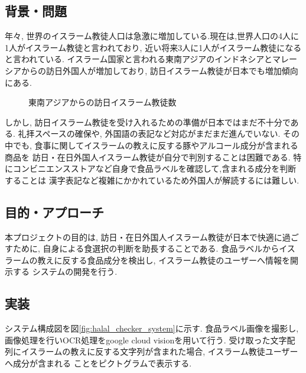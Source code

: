 \subsection{背景・問題}
年々, 世界のイスラーム教徒人口は急激に増加している.現在は,世界人口の4人に1人がイスラーム教徒と言われており,
近い将来3人に1人がイスラーム教徒になると言われている.
イスラーム国家と言われる東南アジアのインドネシアとマレーシアからの訪日外国人が増加しており,
訪日イスラーム教徒が日本でも増加傾向にある.
\begin{figure}[htbp]
    \begin{center}
    \end{center}
    \caption{東南アジアからの訪日イスラーム教徒数}
    \label{fig:muslimvistor}
\end{figure}
しかし, 訪日イスラーム教徒を受け入れるための準備が日本ではまだ不十分である.
礼拝スペースの確保や, 外国語の表記など対応がまだまだ進んでいない.
その中でも, 食事に関してイスラームの教えに反する豚やアルコール成分が含まれる商品を
訪日・在日外国人イスラーム教徒が自分で判別することは困難である.
特にコンビニエンスストアなど自身で食品ラベルを確認して,含まれる成分を判断することは
漢字表記など複雑にかかれているため外国人が解読するには難しい.

\subsection{目的・アプローチ}
本プロジェクトの目的は, 訪日・在日外国人イスラーム教徒が日本で快適に過ごすために,
自身による食選択の判断を助長することである.
食品ラベルからイスラームの教えに反する食品成分を検出し, イスラーム教徒のユーザーへ情報を開示する
システムの開発を行う.

\subsection{実装}
システム構成図を図\ref{fig:halal_checker_system}に示す.
食品ラベル画像を撮影し, 画像処理を行いOCR処理をgoogle cloud visionを用いて行う.
受け取った文字配列にイスラームの教えに反する文字列が含まれた場合, イスラーム教徒ユーザーへ成分が含まれる
ことをピクトグラムで表示する.

